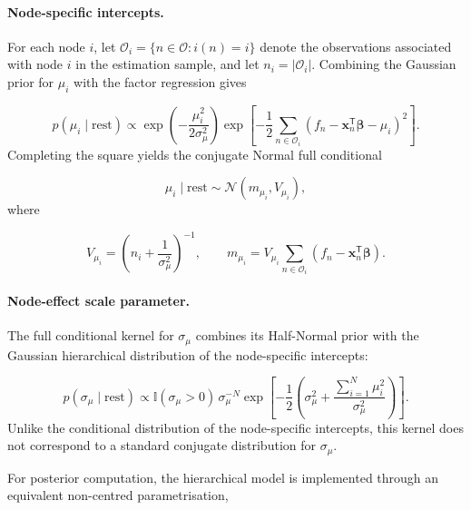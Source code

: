 \documentclass[pdftex,12pt,openright,a4paper,oneside]{book}
\begin{document}
\paragraph{Node-specific intercepts.}

For each node $i$, let
$\mathcal{O}_i=\{n\in\mathcal{O}:i(n)=i\}$
denote the observations associated with node $i$ in the estimation sample,
and let $n_i=|\mathcal{O}_i|$.
Combining the Gaussian prior for $\mu_i$
with the factor regression gives

\begin{equation}
p(\mu_i\mid\mathrm{rest})
\propto 
\exp\left(
-\frac{\mu_i^2}{2\sigma_\mu^2}
\right)
\exp\left[
-\frac12
\sum_{n\in\mathcal{O}_i}
\left(
f_n-\boldsymbol{x}_n^{\mathsf T}
\boldsymbol{\beta}-\mu_i
\right)^2
\right].
\label{eq:node_fc_mu_kernel}
\end{equation}
Completing the square yields the conjugate
Normal full conditional

\begin{equation}
\mu_i\mid\mathrm{rest}
\sim\mathcal{N}(m_{\mu_i},V_{\mu_i}),
\label{eq:node_fc_mu_normal}
\end{equation}
where

\begin{equation*}
V_{\mu_i}=
\left(
n_i+\frac{1}{\sigma_\mu^2}
\right)^{-1},
\qquad
m_{\mu_i}=
V_{\mu_i}
\sum_{n\in\mathcal{O}_i}
\left(
f_n-\boldsymbol{x}_n^{\mathsf T}
\boldsymbol{\beta}
\right).
\end{equation*}

\paragraph{Node-effect scale parameter.}

The full conditional kernel for $\sigma_\mu$
combines its Half-Normal prior with the
Gaussian hierarchical distribution of the
node-specific intercepts:

\begin{equation}
p(\sigma_\mu\mid\mathrm{rest})
\propto 
\mathbb{I}(\sigma_\mu>0)
\,\sigma_\mu^{-N}
\exp\left[
-\frac12
\left(
\sigma_\mu^2+
\frac{\sum_{i=1}^{N}\mu_i^2}
{\sigma_\mu^2}
\right)
\right].
\label{eq:node_fc_sigma_kernel}
\end{equation}
Unlike the conditional distribution of the
node-specific intercepts, this kernel does
not correspond to a standard conjugate
distribution for $\sigma_\mu$.

For posterior computation, the hierarchical
model is implemented through an equivalent
non-centred parametrisation,
\end{document}
